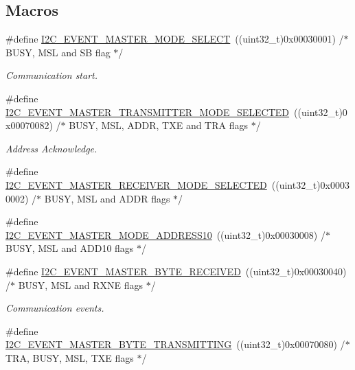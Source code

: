 \subsection*{Macros}
\begin{DoxyCompactItemize}
\item 
\#define \hyperlink{group___i2_c___events_gaeef8c22ac035122b06e31b360ac7aeb3}{I2\+C\+\_\+\+E\+V\+E\+N\+T\+\_\+\+M\+A\+S\+T\+E\+R\+\_\+\+M\+O\+D\+E\+\_\+\+S\+E\+L\+E\+CT}~((uint32\+\_\+t)0x00030001)  /$\ast$ B\+U\+S\+Y, M\+S\+L and S\+B flag $\ast$/
\begin{DoxyCompactList}\small\item\em Communication start. \end{DoxyCompactList}\item 
\#define \hyperlink{group___i2_c___events_ga2361a6e60b7dc86fb682dd06fbd3edb7}{I2\+C\+\_\+\+E\+V\+E\+N\+T\+\_\+\+M\+A\+S\+T\+E\+R\+\_\+\+T\+R\+A\+N\+S\+M\+I\+T\+T\+E\+R\+\_\+\+M\+O\+D\+E\+\_\+\+S\+E\+L\+E\+C\+T\+ED}~((uint32\+\_\+t)0x00070082)  /$\ast$ B\+U\+S\+Y, M\+S\+L, A\+D\+D\+R, T\+X\+E and T\+R\+A flags $\ast$/
\begin{DoxyCompactList}\small\item\em Address Acknowledge. \end{DoxyCompactList}\item 
\#define \hyperlink{group___i2_c___events_gabfde82864432ddb87b6462234d542e60}{I2\+C\+\_\+\+E\+V\+E\+N\+T\+\_\+\+M\+A\+S\+T\+E\+R\+\_\+\+R\+E\+C\+E\+I\+V\+E\+R\+\_\+\+M\+O\+D\+E\+\_\+\+S\+E\+L\+E\+C\+T\+ED}~((uint32\+\_\+t)0x00030002)  /$\ast$ B\+U\+S\+Y, M\+S\+L and A\+D\+D\+R flags $\ast$/
\item 
\#define \hyperlink{group___i2_c___events_gad04882597bbf542c6fee7a9c837fbc8c}{I2\+C\+\_\+\+E\+V\+E\+N\+T\+\_\+\+M\+A\+S\+T\+E\+R\+\_\+\+M\+O\+D\+E\+\_\+\+A\+D\+D\+R\+E\+S\+S10}~((uint32\+\_\+t)0x00030008)  /$\ast$ B\+U\+S\+Y, M\+S\+L and A\+D\+D10 flags $\ast$/
\item 
\#define \hyperlink{group___i2_c___events_ga6bcf2ae49961e07e27cf9fdf334719e3}{I2\+C\+\_\+\+E\+V\+E\+N\+T\+\_\+\+M\+A\+S\+T\+E\+R\+\_\+\+B\+Y\+T\+E\+\_\+\+R\+E\+C\+E\+I\+V\+ED}~((uint32\+\_\+t)0x00030040)  /$\ast$ B\+U\+S\+Y, M\+S\+L and R\+X\+N\+E flags $\ast$/
\begin{DoxyCompactList}\small\item\em Communication events. \end{DoxyCompactList}\item 
\#define \hyperlink{group___i2_c___events_ga037ac1e67e44ee085acac6f034bd73b2}{I2\+C\+\_\+\+E\+V\+E\+N\+T\+\_\+\+M\+A\+S\+T\+E\+R\+\_\+\+B\+Y\+T\+E\+\_\+\+T\+R\+A\+N\+S\+M\+I\+T\+T\+I\+NG}~((uint32\+\_\+t)0x00070080) /$\ast$ T\+R\+A, B\+U\+S\+Y, M\+S\+L, T\+X\+E flags $\ast$/

\end{DoxyCompactItemize}
